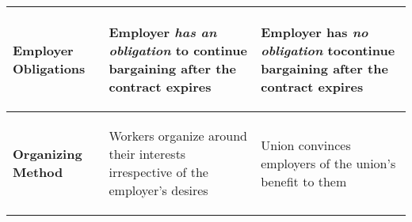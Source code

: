 \begin{table}[!h]
\begin{tabular}{p{30mm}p{87mm}p{87mm}}
\begin{center}\textbf{Employer Obligations}\end{center} & %
\begin{center}\begin{flushleft}Employer \textit{has an obligation} to continue bargaining after the contract expires\end{flushleft}\end{center} & %
\begin{center}\begin{flushleft}Employer has \textit{no obligation} tocontinue bargaining after the contract expires\end{flushleft}\end{center} \\	%
\midrule

\begin{center}\textbf{Organizing Method}\end{center} &	%
\begin{center}\begin{flushleft}Workers organize around their interests irrespective of the employer's desires \end{flushleft}\end{center} & %
\begin{center}\begin{flushleft}Union convinces employers of the union's benefit to them\end{flushleft}\end{center} \\	%
\midrule


\end{tabular}
\end{table}
